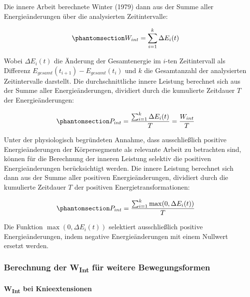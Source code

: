 \documentclass[
  letterpaper,
  DIV=11]{scrartcl}
\makeatletter
\let\oldparagraph\paragraph
\renewcommand{\paragraph}{
    \@ifstar
      \xxxParagraphStar
      \xxxParagraphNoStar
  }
\newcommand{\xxxParagraphStar}[1]{\oldparagraph*{#1}\mbox{}}
\newcommand{\xxxParagraphNoStar}[1]{\oldparagraph{#1}\mbox{}}
\makeatother
\begin{document}
Die innere Arbeit berechnete Winter (1979) dann aus der Summe aller
Energieänderungen über die analysierten Zeitintervalle:

\begin{equation}\phantomsection\label{eq-WInt}{W_{int} = \sum_{i=1}^{k} \Delta E_i(t)}\end{equation}

Wobei \(\Delta E_i(t)\) die Änderung der Gesamtenergie im \(i\)-ten
Zeitintervall als Differenz \(E_{gesamt}(t_{i+1}) - E_{gesamt}(t_i)\)
und \(k\) die Gesamtanzahl der analysierten Zeitintervalle darstellt.
Die durchschnittliche innere Leistung berechnet sich aus der Summe aller
Energieänderungen, dividiert durch die kumulierte Zeitdauer \(T\) der
Energieänderungen:

\begin{equation}\phantomsection\label{eq-PInt}{P_{int} = \frac{\sum_{i=1}^{k} \Delta E_i(t)}{T} = \frac{W_{int}}{T}}\end{equation}

Unter der physiologisch begründeten Annahme, dass ausschließlich
positive Energieänderungen der Körpersegmente als relevante Arbeit zu
betrachten sind, können für die Berechnung der inneren Leistung selektiv
die positiven Energieänderungen berücksichtigt werden. Die innere
Leistung berechnet sich dann aus der Summe aller positiven
Energieänderungen, dividiert durch die kumulierte Zeitdauer \(T\) der
positiven Energietransformationen:

\begin{equation}\phantomsection\label{eq-PInt_positiv}{P_{int} = \frac{\sum_{i=1}^{k} \max(0,\Delta E_i(t))}{T}}\end{equation}

Die Funktion \(\max(0,\Delta E_i(t))\) selektiert ausschließlich
positive Energieänderungen, indem negative Energieänderungen mit einem
Nullwert ersetzt werden.

\subsubsection{\texorpdfstring{Berechnung der W\textsubscript{Int} für
weitere
Bewegungsformen}{Berechnung der WInt für weitere Bewegungsformen}}\label{berechnung-der-wint-fuxfcr-weitere-bewegungsformen}

\paragraph{\texorpdfstring{\textbf{W\textsubscript{Int} bei
Knieextensionen}}{WInt bei Knieextensionen}}\label{wint-bei-knieextensionen}
\end{document}
